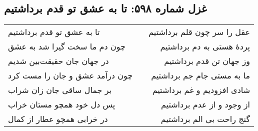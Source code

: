 \begin{center}
\section*{غزل شماره ۵۹۸: تا به عشق تو قدم برداشتیم}
\label{sec:598}
\begin{longtable}{l p{0.5cm} r}
تا به عشق تو قدم برداشتیم
&&
عقل را سر چون قلم برداشتیم
\\
چون دم ما سخت گیرا شد به عشق
&&
پردهٔ هستی به دم برداشتیم
\\
در جهان جان حقیقت‌بین شدیم
&&
وز جهان تن قدم برداشتیم
\\
چون درآمد عشق و جان را مست کرد
&&
ما به مستی جام جم برداشتیم
\\
بر جمال ساقی جان زان شراب
&&
شادی افزودیم و غم برداشتیم
\\
پس دل خود همچو مستان خراب
&&
از وجود و از عدم برداشتیم
\\
در خرابی همچو عطار از کمال
&&
گنج راحت بی الم برداشتیم
\\
\end{longtable}
\end{center}
